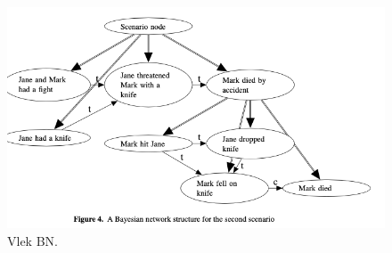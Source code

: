 \begin{figure}[htbp]
\includegraphics[scale=0.55]{images/vlek2015.png}
\caption{Vlek BN.}
\label{vlek}
\end{figure}


